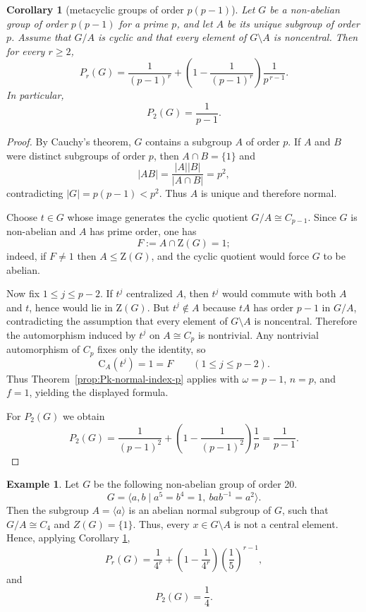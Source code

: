 \documentclass[11pt]{article}
\newtheorem{corollary}[theorem]{Corollary}
\theoremstyle{definition}
\theoremstyle{remark}
\theoremstyle{definition}
\newtheorem{example}[theorem]{Example}
\theoremstyle{plain}
\newcommand{\Z}{\mathrm{Z}}
\newcommand{\C}{\mathrm{C}}
\begin{document}
\begin{corollary}[metacyclic groups of order $p(p-1)$]\label{pp-1 groups}
Let $G$ be a non-abelian group of order $p(p-1)$ for a prime $p$, and let $A$ be its unique subgroup of order $p$.
Assume that $G/A$ is cyclic and that every element of $G\setminus A$ is noncentral.
Then for every $r\ge 2$,
\[
P_r(G)=\frac{1}{(p-1)^r}+\left(1-\frac{1}{(p-1)^r}\right)\frac{1}{p^{\,r-1}}.
\]
In particular,
\[
P_2(G)=\frac{1}{p-1}.
\]
\end{corollary}
\begin{proof}
By Cauchy's theorem, $G$ contains a subgroup $A$ of order $p$.
If $A$ and $B$ were distinct subgroups of order $p$, then $A\cap B=\{1\}$ and
\[
|AB|=\frac{|A||B|}{|A\cap B|}=p^2,
\]
contradicting $|G|=p(p-1)<p^2$.
Thus $A$ is unique and therefore normal.

Choose $t\in G$ whose image generates the cyclic quotient $G/A\cong C_{p-1}$.
Since $G$ is non-abelian and $A$ has prime order, one has
\[
F:=A\cap \Z(G)=1;
\]
indeed, if $F\neq 1$ then $A\le \Z(G)$, and the cyclic quotient would force $G$ to be abelian.

Now fix $1\le j\le p-2$.
If $t^j$ centralized $A$, then $t^j$ would commute with both $A$ and $t$, hence would lie in $\Z(G)$.
But $t^j\notin A$ because $tA$ has order $p-1$ in $G/A$, contradicting the assumption that every element of $G\setminus A$ is noncentral.
Therefore the automorphism induced by $t^j$ on $A\cong C_p$ is nontrivial.
Any nontrivial automorphism of $C_p$ fixes only the identity, so
\[
\C_A(t^j)=1=F \qquad (1\le j\le p-2).
\]
Thus Theorem~\ref{prop:Pk-normal-index-p} applies with $\omega=p-1$, $n=p$, and $f=1$, yielding the displayed formula.

For $P_2(G)$ we obtain
\[
P_2(G)=\frac{1}{(p-1)^2}+\left(1-\frac{1}{(p-1)^2}\right)\frac{1}{p}
=\frac{1}{p-1}.
\]
\end{proof}

\begin{example}
    Let $G$ be the following non-abelian group of order 20.
    $$G=\langle a,b \mid a^5=b^4=1,\ bab^{-1}=a^2\rangle.$$
    Then the subgroup $A=\langle a\rangle$ is an abelian normal subgroup of $G$, such that $G/A\cong C_4$ and $Z(G)=\{1\}$. Thus, every $x\in G\setminus A$ is not a central element. Hence, applying Corollary \ref{pp-1 groups},
    $$P_r(G)=\frac{1}{4^r}+\left(1-\frac{1}{4^r}\right)\left(\frac{1}{5}\right)^{r-1},$$
    and
    $$P_2(G)=\frac{1}{4}.$$
\end{example}
\end{document}
